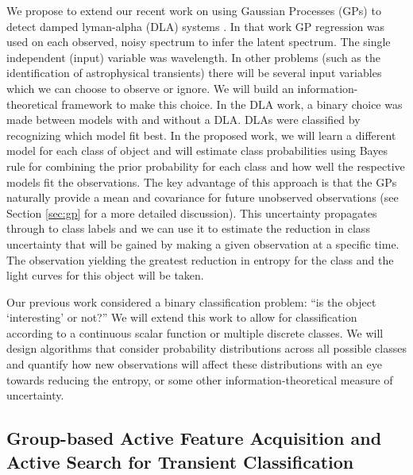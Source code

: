 \documentclass[prd,nofootbib,floatfix,11pt,tightenlines]{revtex4}
\begin{document}
We propose to extend our
recent work on using Gaussian Processes (GPs) to detect damped
lyman-alpha (DLA) systems \cite{Garnett12a}.  In that work GP
regression was used on each observed, noisy spectrum to infer the
latent spectrum.  The single independent (input) variable was
wavelength.  In other problems (such as the identification of
astrophysical transients) there will be several input variables which
we can choose to observe or ignore.  
We will build an information-theoretical framework to make this choice.
In the DLA work, a binary choice was made between models with and
without a DLA.  DLAs were
classified by recognizing which model fit best.  In the proposed work,
we will learn a different model for each class of object and will
estimate class probabilities using Bayes rule for combining the prior
probability for each class and how well the respective models fit the
observations.  
The key advantage of this
approach is that the GPs naturally provide a mean and covariance for
future unobserved observations (see Section \ref{sec:gp} for a more detailed
discussion).  This uncertainty propagates through
to class labels and we can use it to estimate the reduction in class
uncertainty that will be gained by making a given observation at a
specific time.  The observation yielding the greatest reduction in
entropy for the class and the light curves for this object will be
taken.

 Our previous work considered a binary classification problem: ``is
the object `interesting' or not?''  We will extend this work to allow for
classification according to a continuous scalar function or multiple discrete
classes.  We will design algorithms that consider probability distributions
across all possible classes and
quantify how new observations will affect these
distributions with an eye towards reducing the entropy, or some other
information-theoretical measure of uncertainty.

\subsection{Group-based Active Feature Acquisition and Active Search
for Transient Classification}
\end{document}
